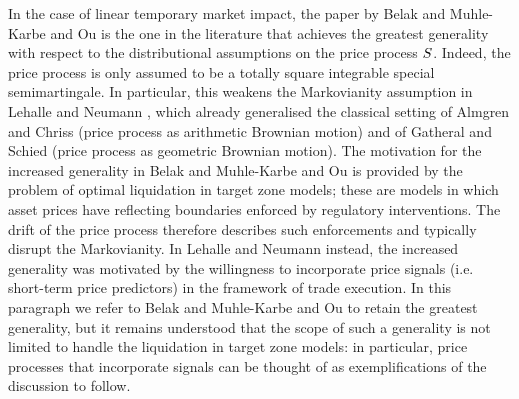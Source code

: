 \documentclass[10pt,a4paper]{article}
\begin{document}
	In the case of linear temporary market impact, the paper by Belak and Muhle-Karbe and Ou \cite{BMO18opt} is the one in the literature that achieves the greatest generality with respect to the distributional assumptions on the price process $S$. Indeed, the price process is only assumed to be a totally square integrable special semimartingale. In particular, this weakens the Markovianity assumption in Lehalle and Neumann \cite{LN19inc}, which already generalised the classical setting of Almgren and Chriss \cite{AC00opt} (price process as arithmetic Brownian motion) and of Gatheral and Schied \cite{GS11opt} (price process as geometric Brownian motion). The motivation for the increased generality in Belak and Muhle-Karbe and Ou \cite{BMO18opt} is provided by the problem of optimal liquidation in target zone models; these are models in which asset prices have reflecting boundaries enforced by regulatory interventions. The drift of the price process therefore describes such enforcements and typically disrupt the Markovianity. In Lehalle and Neumann \cite{LN19inc} instead, the increased generality was motivated by the willingness to incorporate price signals (i.e. short-term price predictors) in the framework of trade execution.  In this  paragraph we refer to   Belak and Muhle-Karbe and Ou \cite{BMO18opt} to retain the greatest generality, but it remains understood that the scope of such a generality is not limited to handle the liquidation in target zone models: in particular, price processes that incorporate signals can be thought of as exemplifications of the discussion to follow. 
	
\end{document}
